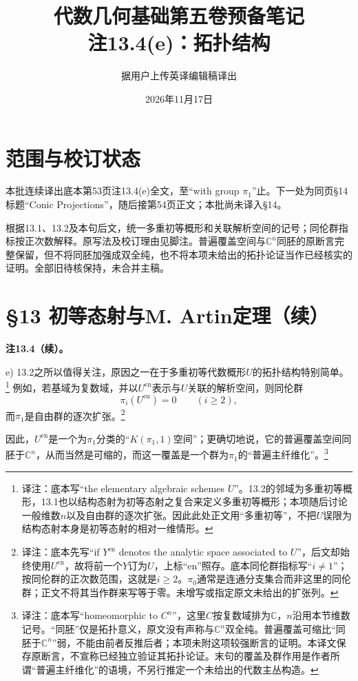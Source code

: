 \documentclass[openany,fontset=fandol]{ctexbook}
\newcommand{\note}[1]{\footnote{译注：#1}}
\begin{document}
\title{代数几何基础第五卷预备笔记\\注13.4(e)：拓扑结构}
\author{据用户上传英译编辑稿译出}
\date{2026年11月17日}
\maketitle
\chapter*{范围与校订状态}
本批连续译出底本第53页注13.4(e)全文，至“with group $\pi_1$”止。下一处为同页§14标题“Conic Projections”，随后接第54页正文；本批尚未译入§14。

根据13.1、13.2及本句后文，统一多重初等概形和关联解析空间的记号；同伦群指标按正次数解释。原写法及校订理由见脚注。普遍覆盖空间与$\mathbb C^n$同胚的原断言完整保留，但不将同胚加强成双全纯，也不将本项未给出的拓扑论证当作已经核实的证明。全部旧待核保持，未合并主稿。
\chapter*{§13 初等态射与M. Artin定理（续）}
\noindent\textbf{注13.4（续）。}

\noindent e) 13.2之所以值得关注，原因之一在于多重初等代数概形$U$的拓扑结构特别简单。\note{底本写“the elementary algebraic schemes $U$”。13.2的邻域为多重初等概形，13.1也以结构态射为初等态射之复合来定义多重初等概形；本项随后讨论一般维数$n$以及自由群的逐次扩张。因此此处正文用“多重初等”，不把$U$误限为结构态射本身是初等态射的相对一维情形。}
例如，若基域为复数域，并以$U^{\mathrm{en}}$表示与$U$关联的解析空间，则同伦群
\[
\pi_i(U^{\mathrm{en}})=0\qquad(i\geq2),
\]
而$\pi_1$是自由群的逐次扩张。\note{底本先写“if $Y^{\mathrm{en}}$ denotes the analytic space associated to $U$”，后文却始终使用$U^{\mathrm{en}}$，故将前一个$Y$订为$U$，上标“en”照存。底本同伦群指标写“$i\ne1$”；按同伦群的正次数范围，这就是$i\geq2$。$\pi_0$通常是连通分支集合而非这里的同伦群；正文不将其当作群来写等于零。未增写或指定原文未给出的扩张列。}

因此，$U^{\mathrm{en}}$是一个为$\pi_1$分类的“$K(\pi_1,1)$空间”；更确切地说，它的普遍覆盖空间同胚于$\mathbb C^n$，从而当然是可缩的，而这一覆盖是一个群为$\pi_1$的“普遍主纤维化”。\note{底本写“homeomorphic to $C^n$”，这里$C$按复数域排为$\mathbb C$，$n$沿用本节维数记号。“同胚”仅是拓扑意义，原文没有声称与$\mathbb C^n$双全纯。普遍覆盖可缩比“同胚于$\mathbb C^n$”弱，不能由前者反推后者；本项未附这项较强断言的证明。本译文保存原断言，不宣称已经独立验证其拓扑论证。末句的覆盖及群作用是作者所谓“普遍主纤维化”的语境，不另行推定一个未给出的代数主丛构造。}
\end{document}
